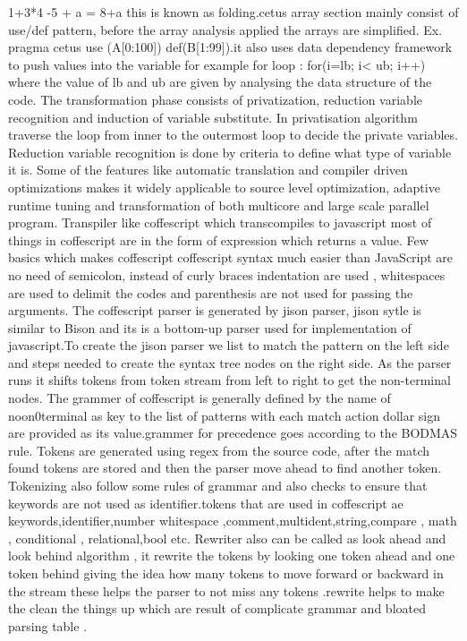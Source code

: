 \documentclass[23pt]{article}
\begin{document}
{1+3*4 -5 + a = 8+a  this is known as folding.cetus array section mainly consist of use/def pattern, before the array analysis applied the arrays are simplified. Ex. pragma cetus use (A[0:100]) def(B[1:99]).it also uses data dependency framework to push values into the variable for example for loop : for(i=lb; i< ub; i++) where the value of lb and ub are given by analysing the data structure of the code. The transformation phase consists of privatization, reduction variable recognition and induction of variable substitute. In privatisation algorithm traverse the loop from inner to the outermost loop to decide the private variables. Reduction variable recognition is done by criteria to define what type of variable it is. Some of the features like automatic translation and compiler driven optimizations makes it widely applicable to source level optimization, adaptive runtime tuning and transformation of both multicore and large scale parallel program.
Transpiler like coffescript  which transcompiles to javascript most of things in coffescript are in the form of expression which returns a value. Few  basics which makes coffescript  coffescript syntax much easier than JavaScript are no need of semicolon, instead of curly braces indentation are used 
, whitespaces are used to delimit the codes and parenthesis are not used for passing the arguments.
The coffescript parser is generated by jison  parser,  jison sytle is similar to Bison and its is a bottom-up parser used for implementation of javascript.To create the jison parser we list to match the pattern on the left side and steps needed to create the syntax tree nodes on the right side. As the parser runs it shifts tokens from token stream from left to right to get the non-terminal nodes.
The grammer of coffescript is generally defined by the name of noon0terminal as key to the list of patterns with each match action dollar sign are provided as its value.grammer for precedence goes according to the BODMAS rule. Tokens are generated using regex from the source code, after the match found tokens are stored and then the parser move ahead to find another token. Tokenizing also follow some rules of grammar and also checks to ensure that keywords are not used as identifier.tokens that are used in coffescript ae keywords,identifier,number whitespace ,comment,multident,string,compare , math , conditional , relational,bool etc.
Rewriter also can  be called as look ahead and look behind algorithm , it rewrite the tokens by looking one token ahead and one token behind giving the idea how many tokens to move forward or backward in the  stream these helps the parser to not miss any tokens .rewrite helps to make the clean the things up which are result of complicate grammar and bloated parsing table .
}
\end{document}
